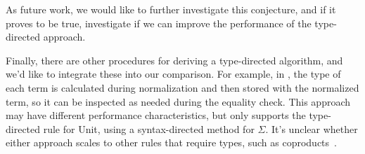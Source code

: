 As future work, we would like to further investigate this conjecture, and if it proves to be true, investigate if we can improve the performance of the type-directed approach.

Finally, there are other procedures for deriving a type-directed algorithm, and we'd like to integrate these into our comparison.
For example, in \citet{elabzoo}, the type of each term is calculated during normalization and then stored with the normalized term, so it can be inspected as needed during the equality check.
This approach may have different performance characteristics, but only supports the type-directed rule for Unit, using a syntax-directed method for $\Sigma$.
It's unclear whether either approach scales to other rules that require types, such as coproducts~\cite{altenkirch2001}.

% 
% 
% 



